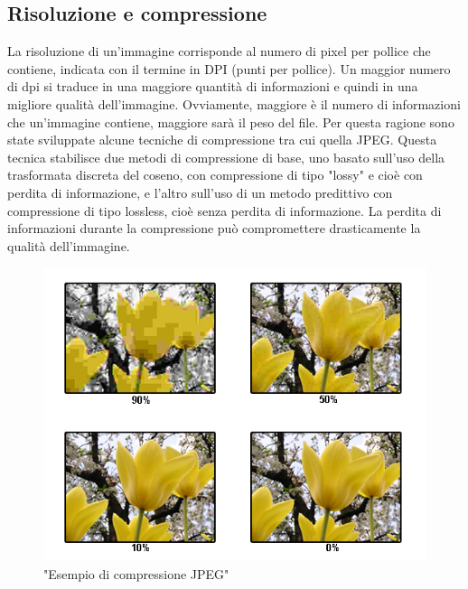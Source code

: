 \documentclass[a4paper,11pt]{article}
\begin{document}
    \subsection{Risoluzione e compressione}
    La risoluzione di un'immagine corrisponde al numero di pixel per pollice che contiene, indicata con il termine in DPI (punti per pollice). 
    Un maggior numero di dpi si traduce in una maggiore quantità di informazioni e quindi in una migliore qualità dell'immagine. 
    Ovviamente, maggiore è il numero di informazioni che un'immagine contiene, maggiore sarà il peso del file. 
    Per questa ragione sono state sviluppate alcune tecniche di compressione tra cui quella JPEG. Questa tecnica stabilisce due metodi di compressione di base,
    uno basato sull'uso della trasformata discreta del coseno, con compressione di tipo "lossy" e cioè con perdita di informazione, e l'altro sull'uso di un metodo predittivo
    con compressione di tipo lossless, cioè senza perdita di informazione. La perdita di informazioni durante la compressione può compromettere drasticamente la qualità dell'immagine.
    \begin{figure}[h]
        \centering
        \includegraphics[scale=0.7]{jpeg.png}
        \caption{"Esempio di compressione JPEG"}
    \end{figure}
    \newpage
\end{document}
